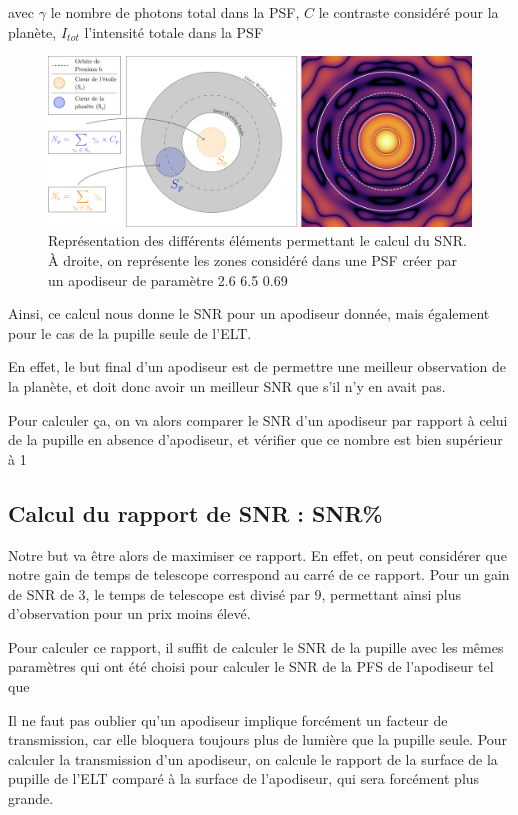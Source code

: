 avec $\gamma$ le nombre de photons total dans la PSF, $C$ le contraste considéré pour la planète, $I_{tot}$ l'intensité totale dans la PSF

\begin{figure}[htbp]
    \centering
    \includegraphics[width=\textwidth]{figures/v2_expl_snr.png}
    \caption{Représentation des différents éléments permettant le calcul du SNR. À droite, on représente les zones considéré dans une PSF créer par un apodiseur de paramètre 2.6 6.5 0.69}
\end{figure}


Ainsi, ce calcul nous donne le SNR pour un apodiseur donnée, mais également pour le cas de la pupille seule de l'ELT.

En effet, le but final d'un apodiseur est de permettre une meilleur observation de la planète, et doit donc avoir un meilleur SNR que s'il n'y en avait pas. 

Pour calculer ça, on va alors comparer le SNR d'un apodiseur par rapport à celui de la pupille en absence d'apodiseur, et vérifier que ce nombre est bien supérieur à 1

\subsection{Calcul du rapport de SNR : SNR\%}

Notre but va être alors de maximiser ce rapport. En effet, on peut considérer que notre gain de temps de telescope correspond au carré de ce rapport. Pour un gain de SNR de 3, le temps de telescope est divisé par 9, permettant ainsi plus d'observation pour un prix moins élevé.

Pour calculer ce rapport, il suffit de calculer le SNR de la pupille avec les mêmes paramètres qui ont été choisi pour calculer le SNR de la PFS de l'apodiseur tel que 

Il ne faut pas oublier qu'un apodiseur implique forcément un facteur de transmission, car elle bloquera toujours plus de lumière que la pupille seule. Pour calculer la transmission d'un apodiseur, on calcule le rapport de la surface de la pupille de l'ELT comparé à la surface de l'apodiseur, qui sera forcément plus grande.

